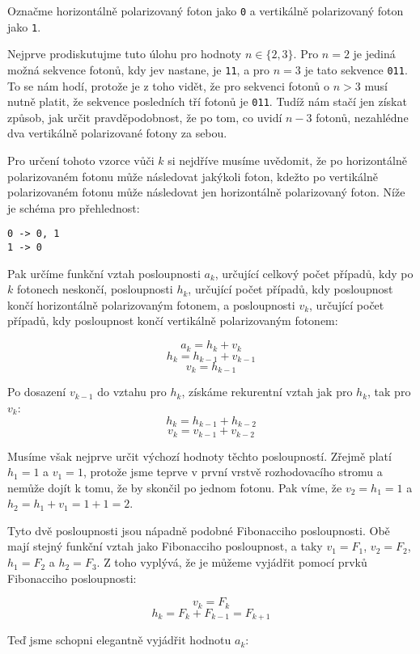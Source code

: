 \documentclass{fkssolpub}
\author{Ondřej Sedláček}
\begin{document}
 

Označme horizontálně polarizovaný foton jako \verb|0| a vertikálně polarizovaný foton jako 
\verb|1|.

Nejprve prodiskutujme tuto úlohu pro hodnoty $n \in \{2, 3\}$. Pro $n = 2$ je jediná možná
sekvence fotonů, kdy jev nastane, je \verb|11|, a pro $n = 3$ je tato sekvence
\verb|011|. To se nám hodí, protože je z toho vidět, že pro sekvenci fotonů o $n > 3$
musí nutně platit, že sekvence posledních tří fotonů je \verb|011|. Tudíž nám stačí
jen získat způsob, jak určit pravděpodobnost, že po tom, co uvidí $n - 3$ fotonů, 
nezahlédne dva vertikálně polarizované fotony za sebou.

Pro určení tohoto vzorce vůči $k$ si nejdříve musíme uvědomit, že po horizontálně polarizovaném
fotonu může následovat jakýkoli foton, kdežto po vertikálně polarizovaném fotonu může
následovat jen horizontálně polarizovaný foton. Níže je schéma pro přehlednost:

\begin{verbatim}
0 -> 0, 1
1 -> 0
\end{verbatim}

Pak určíme funkční vztah posloupnosti $a_k$, určující celkový počet případů, 
kdy po $k$ fotonech neskončí, posloupnosti $h_k$, určující počet
případů, kdy posloupnost končí horizontálně polarizovaným fotonem, a posloupnosti 
$v_k$, určující počet případů, kdy posloupnost končí vertikálně polarizovaným fotonem:

\[
  a_k = h_k + v_k
\]
\[
  h_k = h_{k - 1} + v_{k - 1}
\]
\[
  v_k = h_{k - 1}
\]

Po dosazení $v_{k - 1}$ do vztahu pro $h_k$, získáme rekurentní vztah jak pro 
$h_k$, tak pro $v_k$:
\[
  h_k = h_{k - 1} + h_{k - 2}
\]
\[
  v_k = v_{k - 1} + v_{k - 2}
\]

Musíme však nejprve určit výchozí hodnoty těchto posloupností. Zřejmě platí 
$h_1 = 1$ a $v_1 = 1$, protože jsme teprve v první vrstvě rozhodovacího stromu a 
nemůže dojít k tomu, že by skončil po jednom fotonu. Pak víme, že $v_2 = h_1 = 1$
a $h_2 = h_1 + v_1 = 1 + 1 = 2$.

Tyto dvě posloupnosti jsou nápadně podobné Fibonacciho posloupnosti. Obě mají stejný
funkční vztah jako Fibonacciho posloupnost, a taky $v_1 = F_1$, $v_2 = F_2$, $h_1 = F_2$
a $h_2 = F_3$. Z toho vyplývá, že je můžeme vyjádřit pomocí prvků Fibonacciho posloupnosti:

\[
  v_k = F_k
\]
\[
  h_k = F_k + F_{k - 1} = F_{k + 1}
\]

Teď jsme schopni elegantně vyjádřit hodnotu $a_k$:
\end{document}
